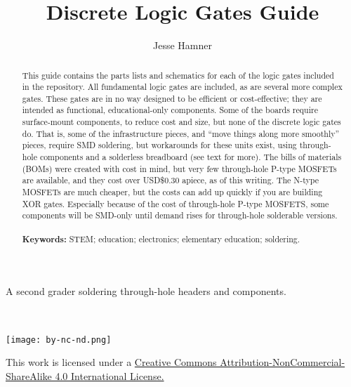 \documentclass[12pt]{article}
\begin{document}
\thispagestyle{empty}
\date{}
\title{Discrete Logic Gates Guide}
\author{Jesse Hamner}


\maketitle

\begin{abstract}
This guide contains the parts lists and schematics for each of the logic gates included in the repository. All fundamental logic gates are included, as are several more complex gates. These gates are in no way designed to be efficient or cost-effective; they are intended as functional, educational-only components. Some of the boards require surface-mount components, to reduce cost and size, but none of the discrete logic gates do. That is, some of the infrastructure pieces, and ``move things along more smoothly'' pieces, require SMD soldering, but workarounds for these units exist, using through-hole components and a solderless breadboard (see text for more). The bills of materials (BOMs) were created with cost in mind, but very few through-hole P-type MOSFETs are available, and they cost over USD\$0.30 apiece, as of this writing. The N-type MOSFETs are much cheaper, but the costs can add up quickly if you are building XOR gates. Especially because of the cost of through-hole P-type MOSFETS, some components will be SMD-only until demand rises for through-hole solderable versions.\\
~\\
\textbf{Keywords:} STEM; education; electronics; elementary education; soldering.

\end{abstract}

\begin{center}

A second grader soldering through-hole headers and components.
\end{center}
\clearpage 

~
\vfill

\begin{center}
\texttt{[image: by-nc-nd.png]}

This work is licensed under a {\color{webblue}\href{https://creativecommons.org/licenses/by-nc-sa/4.0/}{Creative Commons Attribution-NonCommercial-ShareAlike 4.0 International License.}}
\end{center}
\end{document}
